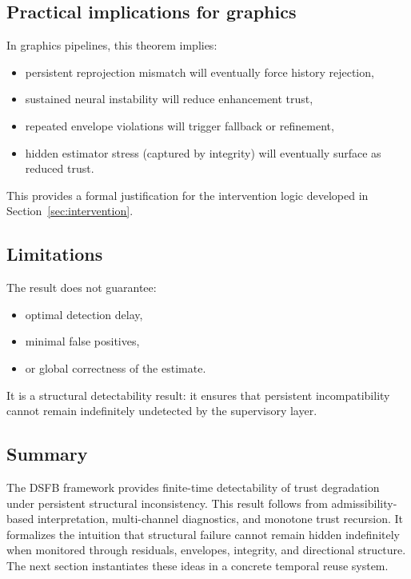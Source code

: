 \documentclass[11pt]{article}
\theoremstyle{definition}
\theoremstyle{plain}
\begin{document}

\subsection{Practical implications for graphics}

In graphics pipelines, this theorem implies:

\begin{itemize}[leftmargin=1.5em]
    \item persistent reprojection mismatch will eventually force history rejection,
    \item sustained neural instability will reduce enhancement trust,
    \item repeated envelope violations will trigger fallback or refinement,
    \item hidden estimator stress (captured by integrity) will eventually surface as reduced trust.
\end{itemize}

This provides a formal justification for the intervention logic developed in Section~\ref{sec:intervention}.


\subsection{Limitations}

The result does not guarantee:
\begin{itemize}[leftmargin=1.5em]
    \item optimal detection delay,
    \item minimal false positives,
    \item or global correctness of the estimate.
\end{itemize}

It is a structural detectability result: it ensures that persistent incompatibility cannot remain indefinitely undetected by the supervisory layer.


\subsection{Summary}

The DSFB framework provides finite-time detectability of trust degradation under persistent structural inconsistency. This result follows from admissibility-based interpretation, multi-channel diagnostics, and monotone trust recursion. It formalizes the intuition that structural failure cannot remain hidden indefinitely when monitored through residuals, envelopes, integrity, and directional structure. The next section instantiates these ideas in a concrete temporal reuse system.
\end{document}

